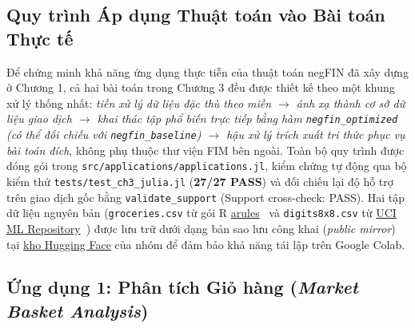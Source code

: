 \documentclass[conference]{IEEEtran}
\begin{document}
\subsection{Quy trình Áp dụng Thuật toán vào Bài toán Thực tế}
Để chứng minh khả năng ứng dụng thực tiễn của thuật toán negFIN đã xây dựng ở Chương 1, cả hai bài toán trong Chương 3 đều được thiết kế theo một khung xử lý thống nhất: \textit{tiền xử lý dữ liệu đặc thù theo miền $\rightarrow$ ánh xạ thành cơ sở dữ liệu giao dịch $\rightarrow$ khai thác tập phổ biến trực tiếp bằng hàm \texttt{negfin\_optimized} (có thể đối chiếu với \texttt{negfin\_baseline}) $\rightarrow$ hậu xử lý trích xuất tri thức phục vụ bài toán đích}, không phụ thuộc thư viện FIM bên ngoài. Toàn bộ quy trình được đóng gói trong \texttt{src/applications/applications.jl}, kiểm chứng tự động qua bộ kiểm thử \texttt{tests/test\_ch3\_julia.jl} (\textbf{27/27 PASS}) và đối chiếu lại độ hỗ trợ trên giao dịch gốc bằng \texttt{validate\_support} (Support cross-check: PASS). Hai tập dữ liệu nguyên bản (\texttt{groceries.csv} từ gói R \href{https://michael.hahsler.net/arules/reference/Groceries.html}{arules}~\cite{b10} và \texttt{digits8x8.csv} từ \href{https://archive.ics.uci.edu/dataset/80/optical+recognition+of+handwritten+digits}{UCI ML Repository}~\cite{b13}) được lưu trữ dưới dạng bản sao lưu công khai (\textit{public mirror}) tại \href{https://huggingface.co/datasets/stephent9/Lab1_Frequent_Itemset_Mining}{kho Hugging Face} của nhóm để đảm bảo khả năng tái lập trên Google Colab.

\subsection{Ứng dụng 1: Phân tích Giỏ hàng (\textit{Market Basket Analysis})}
\end{document}
